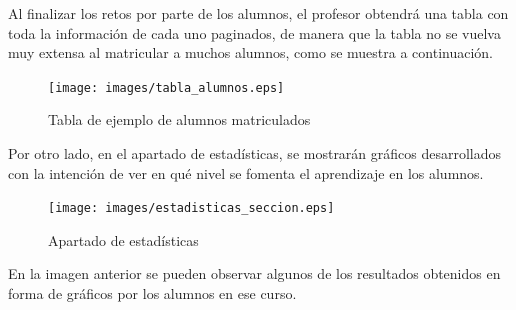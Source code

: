 Al finalizar los retos por parte de los alumnos, el profesor obtendrá una tabla con toda la información de cada uno paginados, de manera que la tabla no se vuelva muy extensa al matricular a muchos alumnos, como se muestra a continuación.

\begin{figure}[!th]
\begin{center}
\texttt{[image: images/tabla\_alumnos.eps]}
\caption{Tabla de ejemplo de alumnos matriculados}
\label{fig:21}
\end{center}
\end{figure}

\newpage
Por otro lado, en el apartado de estadísticas, se mostrarán gráficos desarrollados con la intención de ver en qué nivel se fomenta el aprendizaje en los alumnos.

\begin{figure}[!th]
\begin{center}
\texttt{[image: images/estadisticas\_seccion.eps]}
\caption{Apartado de estadísticas}
\label{fig:22}
\end{center}
\end{figure}

En la imagen anterior se pueden observar algunos de los resultados obtenidos en forma de gráficos por los alumnos en ese curso.